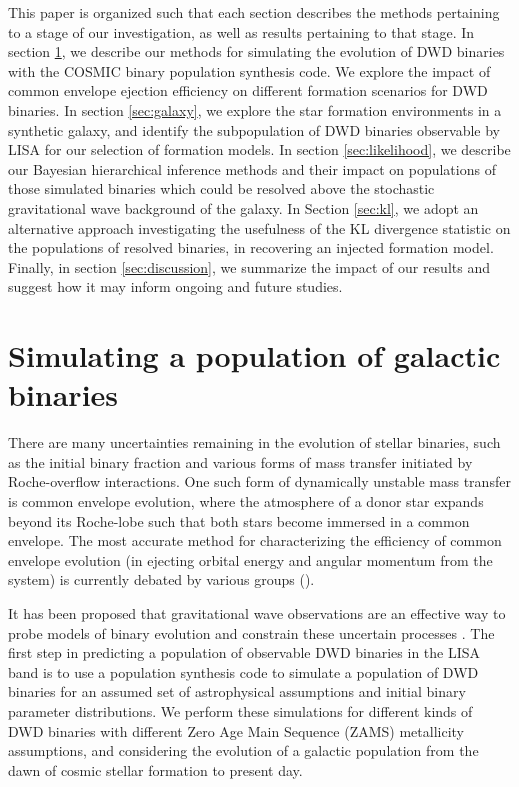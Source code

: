 \documentclass[twocolumn]{aastex631}
\begin{document}
This paper is organized such that each section describes the methods
    pertaining to a stage of our investigation, as well as 
    results pertaining to that stage.
In section \ref{sec:cosmic}, we describe our methods for simulating
    the evolution of DWD binaries with the COSMIC binary population synthesis code.
    We explore the impact of common envelope ejection efficiency
    on different formation scenarios
    for DWD binaries.
In section \ref{sec:galaxy}, we explore the star formation environments in a synthetic galaxy,
    and identify the subpopulation of DWD binaries observable by LISA
    for our selection of formation models.
In section \ref{sec:likelihood}, we describe our Bayesian hierarchical
    inference methods and their impact on populations of those simulated binaries
    which could be resolved above the stochastic gravitational wave background of 
    the galaxy.
In Section \ref{sec:kl}, we adopt an alternative approach investigating the
    usefulness of the KL divergence statistic on the populations of resolved binaries,
    in recovering an injected formation model.
Finally, in section \ref{sec:discussion}, we summarize the impact of our results
    and suggest how it may inform ongoing and future studies.
 \section{Simulating a population of galactic binaries}
\label{sec:cosmic}
There are many uncertainties remaining in the evolution of stellar
    binaries, such as the initial binary fraction \citep{Thiele2023}
    and various forms of mass transfer initiated by Roche-overflow interactions.
One such form of dynamically unstable mass transfer is common envelope evolution,
    where the atmosphere of a donor star expands beyond its Roche-lobe such that both stars become immersed in
    a common envelope.
The most accurate method for characterizing the efficiency of common envelope
    evolution (in ejecting orbital energy and angular momentum from the system)
    is currently debated by various groups 
    (\citep[e.g.][]{IvanovaRemnant2011,IvanovaEnthalpy2011,Klencki2021,Wilson2022}).

It has been proposed that gravitational wave observations
    are an effective way to probe models of binary evolution
    and constrain these uncertain processes
    \citep{Barrett2017,Belczynski2020-EvolutionaryRoads,Thiele2023,
    st_inference_interp}.
The first step in predicting a population of observable DWD binaries
    in the LISA band is to use a population synthesis 
    code to simulate a population of
    DWD binaries for an assumed set of astrophysical assumptions 
    and initial binary parameter distributions.
We perform these simulations for different kinds of DWD binaries
    with different Zero Age Main Sequence (ZAMS) metallicity assumptions,
    and considering the evolution of a galactic population from
    the dawn of cosmic stellar formation to present day.
\end{document}
